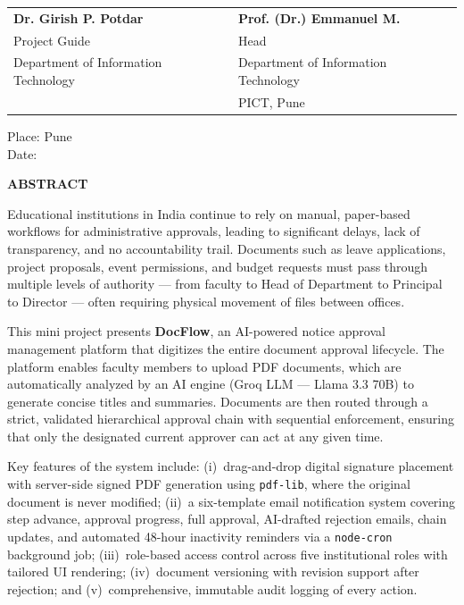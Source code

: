 \documentclass[12pt,a4paper]{report}
\begin{document}
\vspace{2cm}

\noindent
\begin{tabular}{p{} p{}}
\textbf{Dr. Girish P. Potdar} & \hfill\textbf{Prof. (Dr.) Emmanuel M.}\\
Project Guide & \hfill Head\\
Department of Information Technology & \hfill Department of Information Technology\\
                & \hfill PICT, Pune
\end{tabular}

\vspace{1cm}

\noindent
Place: Pune\\
Date: \underline{\hspace{3cm}}

\newpage
\pagestyle{empty}
\begin{center}
{\large\bfseries ABSTRACT}
\end{center}
\vspace{0.3cm}

Educational institutions in India continue to rely on manual, paper-based workflows for administrative approvals, leading to significant delays, lack of transparency, and no accountability trail. Documents such as leave applications, project proposals, event permissions, and budget requests must pass through multiple levels of authority --- from faculty to Head of Department to Principal to Director --- often requiring physical movement of files between offices.

This mini project presents \textbf{DocFlow}, an AI-powered notice approval management platform that digitizes the entire document approval lifecycle. The platform enables faculty members to upload PDF documents, which are automatically analyzed by an AI engine (Groq LLM --- Llama 3.3 70B) to generate concise titles and summaries. Documents are then routed through a strict, validated hierarchical approval chain with sequential enforcement, ensuring that only the designated current approver can act at any given time.

Key features of the system include: (i)~drag-and-drop digital signature placement with server-side signed PDF generation using \texttt{pdf-lib}, where the original document is never modified; (ii)~a six-template email notification system covering step advance, approval progress, full approval, AI-drafted rejection emails, chain updates, and automated 48-hour inactivity reminders via a \texttt{node-cron} background job; (iii)~role-based access control across five institutional roles with tailored UI rendering; (iv)~document versioning with revision support after rejection; and (v)~comprehensive, immutable audit logging of every action.
\end{document}
